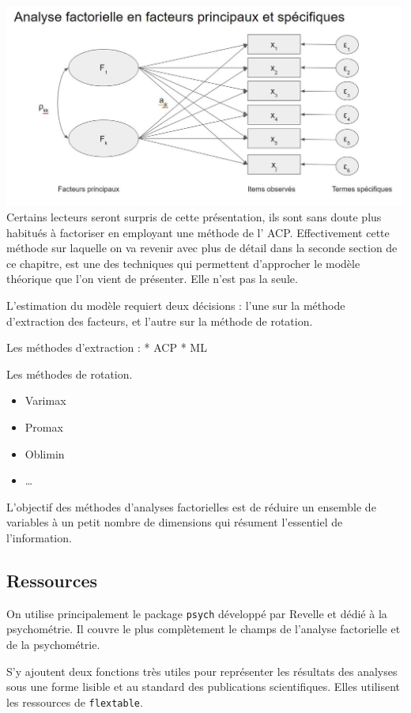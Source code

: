 \documentclass[
]{book}
\providecommand{\tightlist}{%
  \setlength{\itemsep}{0pt}\setlength{\parskip}{0pt}}
\begin{document}
\includegraphics{./Images/FA01.jpg}
Certains lecteurs seront surpris de cette présentation, ils sont sans doute plus habitués à factoriser en employant une méthode de l' ACP. Effectivement cette méthode sur laquelle on va revenir avec plus de détail dans la seconde section de ce chapitre, est une des techniques qui permettent d'approcher le modèle théorique que l'on vient de présenter. Elle n'est pas la seule.

L'estimation du modèle requiert deux décisions : l'une sur la méthode d'extraction des facteurs, et l'autre sur la méthode de rotation.

Les méthodes d'extraction :
* ACP
* ML

Les méthodes de rotation.

\begin{itemize}
\tightlist
\item
  Varimax
\item
  Promax
\item
  Oblimin
\item
  \ldots{}
\end{itemize}

L'objectif des méthodes d'analyses factorielles est de réduire un ensemble de variables à un petit nombre de dimensions qui résument l'essentiel de l'information.

\hypertarget{ressources}{%
\subsection{Ressources}\label{ressources}}

On utilise principalement le package \texttt{psych} développé par Revelle et dédié à la psychométrie. Il couvre le plus complètement le champs de l'analyse factorielle et de la psychométrie.

S'y ajoutent deux fonctions très utiles pour représenter les résultats des analyses sous une forme lisible et au standard des publications scientifiques. Elles utilisent les ressources de \texttt{flextable}.
\end{document}

